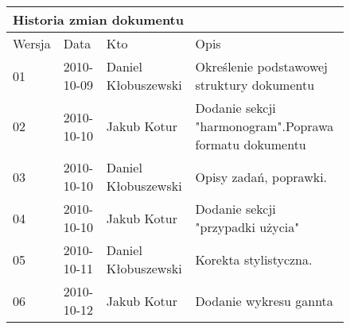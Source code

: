 \begin{figure}[h]
	\centering

\begin{tabular}{|p{}|p{}|p{}|p{}|}
	\hline
	\multicolumn{4}{|l|}{Historia zmian dokumentu} \\
	\hline
	Wersja & Data & Kto & Opis \\
	\hline
	01 & 2010-10-09 & Daniel Kłobuszewski &
	Określenie podstawowej struktury dokumentu \\
	\hline
	02 & 2010-10-10 & Jakub Kotur &
	Dodanie sekcji "harmonogram".\newline  Poprawa formatu dokumentu \\
	\hline
	03 & 2010-10-10 & Daniel Kłobuszewski &
	Opisy zadań, poprawki. \\
	\hline
	04 & 2010-10-10 & Jakub Kotur &
	Dodanie sekcji "przypadki użycia" \\
	\hline
	05 & 2010-10-11 & Daniel Kłobuszewski &
	Korekta stylistyczna. \\
	\hline
	06 & 2010-10-12 & Jakub Kotur &
	Dodanie wykresu gannta \\
	\hline
\end{tabular}

	\label{tab:metric}
\end{figure}

